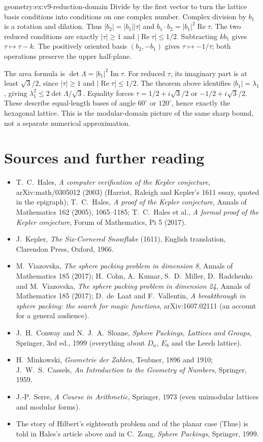 \begin{solution}{geometry:ex:v9-reduction-domain}
\idea Divide by the first vector to turn the lattice basis conditions into
conditions on one complex number.
\writeup Complex division by $b_1$ is a rotation and dilation.
Thus $|b_2|=|b_1||\tau|$ and
$b_1\cdot b_2=|b_1|^2\operatorname{Re}\tau$.
The two reduced conditions are exactly $|\tau|\ge1$ and
$|\operatorname{Re}\tau|\le1/2$.
Subtracting $kb_1$ gives $\tau\mapsto\tau-k$.
The positively oriented basis $(b_2,-b_1)$ gives
$\tau\mapsto-1/\tau$; both operations preserve the upper half-plane.

The area formula is
$\det\Lambda=|b_1|^2\operatorname{Im}\tau$.
For reduced $\tau$, its imaginary part is at least $\sqrt3/2$, since
$|\tau|\ge1$ and $|\operatorname{Re}\tau|\le1/2$.
The theorem above identifies $|b_1|=\lambda_1$, giving
$\lambda_1^2\le2\det\Lambda/\sqrt3$.
Equality forces $\tau=1/2+i\sqrt3/2$ or $-1/2+i\sqrt3/2$.
These describe equal-length bases of angle $60^\circ$ or $120^\circ$,
hence exactly the hexagonal lattice. This is the modular-domain picture
of the same sharp bound, not a separate numerical approximation.
\end{solution}

\section*{Sources and further reading}

\begin{itemize}
\item T.~C.~Hales, \emph{A computer verification of the Kepler conjecture}, arXiv:math/0305012 (2003) (Harriot, Raleigh and Kepler's 1611 essay, quoted in the
epigraph); T.~C.~Hales, \emph{A proof of the Kepler conjecture}, Annals of Mathematics 162 (2005), 1065--1185; T.~C.~Hales et al., \emph{A formal proof of the
Kepler conjecture}, Forum of Mathematics, Pi 5 (2017).
\item J.~Kepler, \emph{The Six-Cornered Snowflake} (1611), English translation, Clarendon Press, Oxford, 1966.
\item M.~Viazovska, \emph{The sphere packing problem in dimension 8}, Annals of Mathematics 185 (2017); H.~Cohn, A.~Kumar, S.~D.~Miller, D.~Radchenko and
M.~Viazovska, \emph{The sphere packing problem in dimension 24}, Annals of Mathematics 185 (2017); D.~de~Laat and F.~Vallentin, \emph{A breakthrough in sphere
packing: the search for magic functions}, arXiv:1607.02111 (an account for a general audience).
\item J.~H.~Conway and N.~J.~A.~Sloane, \emph{Sphere Packings, Lattices and Groups}, Springer, 3rd ed., 1999 (everything about $D_n$, $E_8$ and the Leech lattice).
\item H.~Minkowski, \emph{Geometrie der Zahlen}, Teubner, 1896 and 1910; J.~W.~S.~Cassels, \emph{An Introduction to the Geometry of Numbers}, Springer, 1959.
\item J.-P.~Serre, \emph{A Course in Arithmetic}, Springer, 1973 (even unimodular lattices and modular forms).
\item The story of Hilbert's eighteenth problem and of the planar case (Thue) is told in Hales's article above and in C.~Zong, \emph{Sphere Packings},
Springer, 1999.
\end{itemize}
